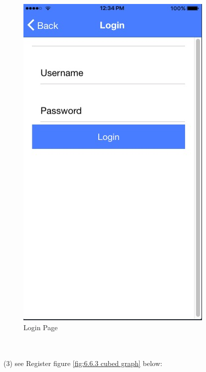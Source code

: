 \begin{figure}[h]
	\centering
	\includegraphics[scale=0.5]{img/Login.png}
	\caption{Login Page}
	\label{fig:6.6.2 cubed graph}
\end{figure}
\\ \\ (3) see Register figure \ref{fig:6.6.3 cubed graph} below:
